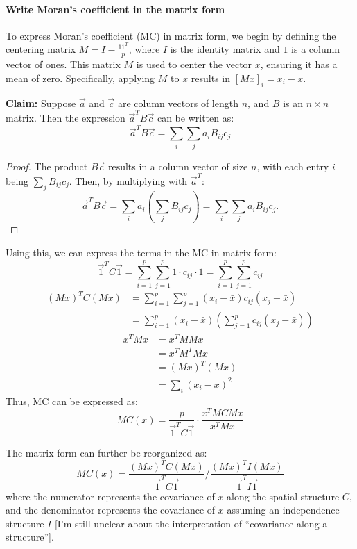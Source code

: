 \documentclass[12pt]{article}
\begin{document}
\paragraph{Write Moran's coefficient in the matrix form}

To express Moran's coefficient (MC) in matrix form, we begin by defining the centering matrix \( M = I - \frac{1 1^T}{p} \), where \( I \) is the identity matrix and \( 1 \) is a column vector of ones. This matrix \( M \) is used to center the vector \( x \), ensuring it has a mean of zero. Specifically, applying \( M \) to \( x \) results in \( [M x]_i = x_i - \bar{x} \).

{\bf Claim:} Suppose \( \vec{a} \) and \( \vec{c} \) are column vectors of length \( n \), and \( B \) is an \( n \times n \) matrix. Then the expression \( \vec{a}^T B \vec{c} \) can be written as:
\[
  \vec{a}^T B \vec{c} = \sum_i \sum_j a_i B_{ij} c_j
\]
\begin{proof}
  The product \( B \vec{c} \) results in a column vector of size \( n \), with each entry \( i \) being \( \sum_j B_{ij} c_j \). Then, by multiplying with \( \vec{a}^T \):
  \[
    \vec{a}^T B \vec{c} = \sum_i a_i \left( \sum_j B_{ij} c_j \right) = \sum_i \sum_j a_i B_{ij} c_j.
  \]
\end{proof}

Using this, we can express the terms in the MC in matrix form:
\[
  \vec{1}^T C \vec{1} = \sum_{i=1}^p \sum_{j=1}^p 1 \cdot c_{i j} \cdot 1 = \sum_{i=1}^p \sum_{j=1}^p c_{i j} 
\]
\begin{align*}
  (M x)^T C (M x) & = \sum_{i=1}^p \sum_{j=1}^p (x_i - \bar{x}) c_{ij} (x_{j} - \bar{x}) \\
                  & = \sum_{i=1}^p (x_i - \bar{x}) \left( \sum_{j=1}^p c_{ij} (x_j - \bar{x}) \right)
\end{align*}
\begin{align*}
  x^T M x & = x^T M M x \\
          & = x^T M^T M x \\
          & = (M x)^T (M x) \\
          & = \sum_i (x_i - \bar{x})^2
\end{align*}
Thus, MC can be expressed as:
\[
  M C(x) = \frac{p}{\vec{1}^T C \vec{1}} \cdot \frac{x^T M C M x}{x^T M x}
\]

The matrix form can further be reorganized as:
\[
  M C (x) = \frac{(M x)^T C (M x)}{\vec{1}^T C \vec{1}} / \frac{(M x)^T I (M x)}{\vec{1}^T I \vec{1}}
\]
where the numerator represents the covariance of \( x \) along the spatial structure \( C \), and the denominator represents the covariance of \( x \) assuming an independence structure \( I \) [I'm still unclear about the interpretation of ``covariance along a structure''].
\end{document}
